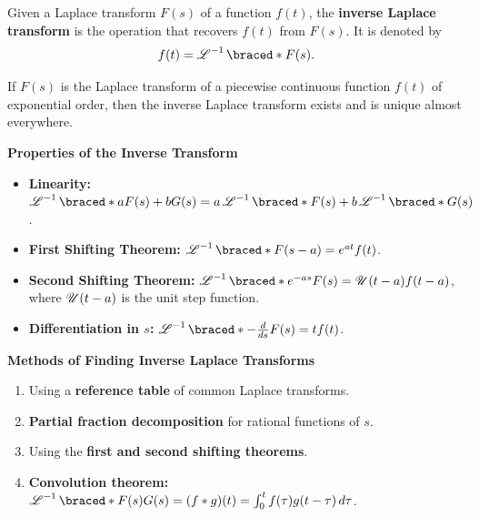     \begin{definition}
      Given a Laplace transform $F(s)$ of a function $f(t)$, the \textbf{inverse Laplace transform} is the operation that recovers $f(t)$ from $F(s)$.
      It is denoted by
      \[
      f(t) = \laplace^{-1}\braced*{F(s)}.
      \]
    \end{definition}


    \begin{theorem}
    If $F(s)$ is the Laplace transform of a piecewise continuous function $f(t)$ of exponential order, then the inverse Laplace transform exists and is unique almost everywhere.
    \end{theorem}

    \textbf{Properties of the Inverse Transform}

    \begin{itemize}
      \item \textbf{Linearity:} $\laplace^{-1}\braced*{a F(s) + b G(s)} = a \laplace^{-1}\braced*{F(s)} + b \laplace^{-1}\braced*{G(s)}$.
      \item \textbf{First Shifting Theorem:} $\laplace^{-1}\braced*{F(s-a)} = e^{at} f(t)$.
      \item \textbf{Second Shifting Theorem:} $\laplace^{-1}\braced*{e^{-as} F(s)} = \hstep(t-a) f(t-a)$, where $\operatorname{\mathscr{U}}(t-a)$ is the unit step function.
      \item \textbf{Differentiation in $s$:} $\laplace^{-1}\braced*{-\frac{d}{ds} F(s)} = t f(t)$.
    \end{itemize}

    \textbf{Methods of Finding Inverse Laplace Transforms}

    \begin{enumerate}
      \item Using a \textbf{reference table} of common Laplace transforms.
      \item \textbf{Partial fraction decomposition} for rational functions of $s$.
      \item Using the \textbf{first and second shifting theorems}.
      \item \textbf{Convolution theorem:} $\laplace^{-1}\braced*{F(s)G(s)} = (f*g)(t) = \int_0^t f(\tau) g(t-\tau) \, d\tau$.
    \end{enumerate}


    \begin{marginfigure}
        
    \end{marginfigure}


